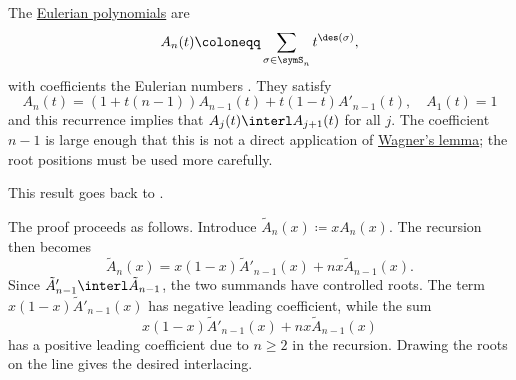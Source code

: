 \begin{example*}\label{ex:eulerianSturm}

The \hyperref[eulerianPolynomial]{Eulerian polynomials} are
\[
  A_n(t) \coloneqq \sum_{\sigma \in \symS_n} t^{\des(\sigma)},
\]
with coefficients the Eulerian numbers .  They satisfy
\[
A_n(t) = (1+t(n-1))A_{n-1}(t) + t(1-t) A'_{n-1}(t), \quad A_1(t)=1
\]
and this recurrence implies that \(A_j(t)\interl A_{j+1}(t)\) for all \(j\).
The coefficient \(n-1\) is large enough that this is not a
direct application of \hyperref[interlacingPolynomials]{Wagner's lemma}; the
root positions must be used more carefully.

This result goes back to  \cite{Frobenius1910}.

The proof proceeds as follows.  Introduce
$\tilde{A}_n(x) \coloneqq x A_n(x)$.
The recursion then becomes
\[
\tilde{A}_n(x) = x(1-x)\tilde{A}'_{n-1}(x) + nx \tilde{A}_{n-1}(x).
\]
Since \(\tilde{A}'_{n-1}\interl \tilde{A}_{n-1}\), the two summands have
controlled roots.  The term \(x(1-x)\tilde{A}'_{n-1}(x)\) has negative
leading coefficient, while the sum
\[
x(1-x)\tilde{A}'_{n-1}(x) + nx \tilde{A}_{n-1}(x)
\]
has a positive leading coefficient due to $n \geq 2$ in the recursion.
Drawing the roots on the line gives the desired interlacing.
\end{example*}


